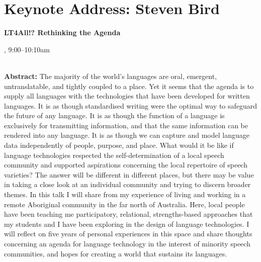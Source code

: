 \section{Keynote Address: Steven Bird}

\begin{center}
\begin{Large}
{\bfseries\Large LT4All!? Rethinking the Agenda}
\vspace{1em}\par
\end{Large}

\daydateyear, 9:00--10:10am \vspace{1em}\\
\PlenaryLoc \\
\vspace{1em}\par
\end{center}

\noindent
{\bfseries Abstract:} The majority of the world's languages are oral, emergent, untranslatable, and tightly coupled to a place. Yet it seems that the agenda is to supply all languages with the technologies that have been developed for written languages. It is as though standardised writing were the optimal way to safeguard the future of any language. It is as though the function of a language is exclusively for transmitting information, and that the same information can be rendered into any language. It is as though we can capture and model language data independently of people, purpose, and place. What would it be like if language technologies respected the self-determination of a local speech community and supported aspirations concerning the local repertoire of speech varieties? The answer will be different in different places, but there may be value in taking a close look at an individual community and trying to discern broader themes. In this talk I will share from my experience of living and working in a remote Aboriginal community in the far north of Australia. Here, local people have been teaching me participatory, relational, strengths-based approaches that my students and I have been exploring in the design of language technologies. I will reflect on five years of personal experiences in this space and share thoughts concerning an agenda for language technology in the interest of minority speech communities, and hopes for creating a world that sustains its languages.

